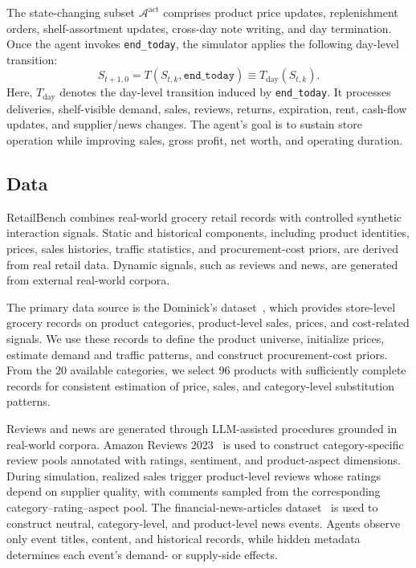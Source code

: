 The state-changing subset $\mathcal{A}^{\mathrm{act}}$ comprises product price updates, replenishment orders, shelf-assortment updates, cross-day note writing, and day termination. Once the agent invokes \texttt{end\_today}, the simulator applies the following day-level transition:
\begin{equation}
\label{eq:end_today_transition}
S_{t+1,0}=T(S_{t,k},\mathtt{end\_today})\equiv T_{\mathrm{day}}(S_{t,k}).
\end{equation}
Here, $T_{\mathrm{day}}$ denotes the day-level transition induced by \texttt{end\_today}. It processes deliveries, shelf-visible demand, sales, reviews, returns, expiration, rent, cash-flow updates, and supplier/news changes. The agent's goal is to sustain store operation while improving sales, gross profit, net worth, and operating duration.

\subsection{Data}
RetailBench combines real-world grocery retail records with controlled synthetic interaction signals. Static and historical components, including product identities, prices, sales histories, traffic statistics, and procurement-cost priors, are derived from real retail data. Dynamic signals, such as reviews and news, are generated from external real-world corpora. 

The primary data source is the Dominick's dataset~\citep{DominicksDataset}, which provides store-level grocery records on product categories, product-level sales, prices, and cost-related signals. We use these records to define the product universe, initialize prices, estimate demand and traffic patterns, and construct procurement-cost priors. From the 20 available categories, we select 96 products with sufficiently complete records for consistent estimation of price, sales, and category-level substitution patterns.

Reviews and news are generated through LLM-assisted procedures grounded in real-world corpora. Amazon Reviews 2023~\citep{hou2024bridging} is used to construct category-specific review pools annotated with ratings, sentiment, and product-aspect dimensions. During simulation, realized sales trigger product-level reviews whose ratings depend on supplier quality, with comments sampled from the corresponding category--rating--aspect pool. The financial-news-articles dataset~\citep{ashraq2025financialNewsArticles} is used to construct neutral, category-level, and product-level news events. Agents observe only event titles, content, and historical records, while hidden metadata determines each event's demand- or supply-side effects.
